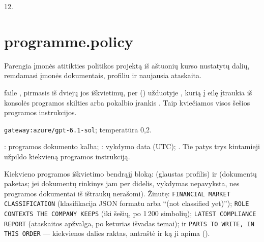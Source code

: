  12.


\section{programme.policy}\label{sec:aprompts:programme-policy}

 Parengia įmonės atitikties politikos projektą iš aštuonių kurso
nustatytų dalių, remdamasi įmonės dokumentais, profiliu ir naujausia ataskaita.

  faile , pirmasis iš dviejų
jos iškvietimų, per  () užduotyje ,
kurią į eilę įtraukia  iš konsolės programos skilties
arba pokalbio įrankis . Taip kviečiamos visos šešios programos
instrukcijos.

 \texttt{gateway:azure/gpt-6.1-sol}; temperatūra 0,2.

 : programos dokumento kalba; :
vykdymo data (UTC); . Tie patys trys kintamieji užpildo kiekvieną
programos instrukciją.

 Kiekvieno programos iškvietimo bendrąjį bloką: 
(glaustas profilis) ir  (dokumentų paketas; jei dokumentų rinkinys jam per
didelis, vykdymas nepavyksta, nes programos dokumentai iš ištraukų nerašomi). Žinutę:
\texttt{FINANCIAL MARKET CLASSIFICATION} (klasifikacija JSON formatu arba
\enquote{(not classified yet)}); \texttt{ROLE CONTEXTS THE COMPANY KEEPS} (iki šešių,
po 1\,200 simbolių); \texttt{LATEST COMPLIANCE REPORT} (ataskaitos apžvalga, po keturias išvadas
temai); ir \texttt{PARTS TO WRITE, IN THIS ORDER} --- kiekvienos dalies raktas, antraštė ir ką ji
apima ().


